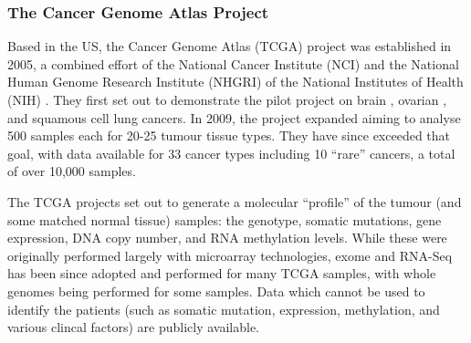 \subsubsection{The Cancer Genome Atlas Project}
Based in the US, the Cancer Genome Atlas (TCGA) project was established in 2005, a combined effort of the National Cancer Institute (NCI) and the National Human Genome Research Institute (NHGRI) of the National Institutes of Health (NIH) \citep{TCGA2017web}. They first set out to demonstrate the pilot project on brain \citep{TCGA2008GBM}, ovarian \citep{TCGA2011OV}, and squamous cell lung \citep{TCGA2012LUSC} cancers. In 2009, the project expanded aiming to analyse 500 samples each for 20-25 tumour tissue types. They have since exceeded that goal, with data available for 33 cancer types including 10 ``rare'' cancers, a total of over 10,000 samples.

The TCGA projects set out to generate a molecular ``profile'' of the tumour (and some matched normal tissue) samples: the genotype, somatic mutations, gene expression, DNA copy number, and RNA methylation levels. While these were originally performed largely with microarray technologies, exome and RNA-Seq has been since adopted and performed for many TCGA samples, with whole genomes being performed for some samples. Data which cannot be used to identify the patients (such as somatic mutation, expression, methylation, and various clincal factors) are publicly available.

